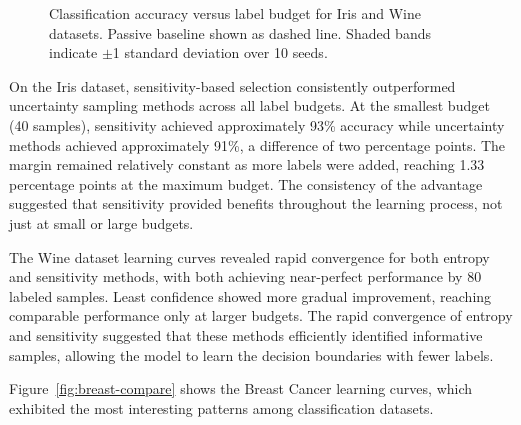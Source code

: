 \documentclass[conference]{IEEEtran}
\begin{document}
\begin{figure}[t]
\centering
{}
\hfill
{}
\caption{Classification accuracy versus label budget for Iris and Wine datasets. Passive baseline shown as dashed line. Shaded bands indicate $\pm$1 standard deviation over 10 seeds.}
\label{fig:iris-compare}
\end{figure}

On the Iris dataset, sensitivity-based selection consistently outperformed uncertainty sampling methods across all label budgets. At the smallest budget (40 samples), sensitivity achieved approximately 93\% accuracy while uncertainty methods achieved approximately 91\%, a difference of two percentage points. The margin remained relatively constant as more labels were added, reaching 1.33 percentage points at the maximum budget. The consistency of the advantage suggested that sensitivity provided benefits throughout the learning process, not just at small or large budgets.

The Wine dataset learning curves revealed rapid convergence for both entropy and sensitivity methods, with both achieving near-perfect performance by 80 labeled samples. Least confidence showed more gradual improvement, reaching comparable performance only at larger budgets. The rapid convergence of entropy and sensitivity suggested that these methods efficiently identified informative samples, allowing the model to learn the decision boundaries with fewer labels.

Figure~\ref{fig:breast-compare} shows the Breast Cancer learning curves, which exhibited the most interesting patterns among classification datasets.
\end{document}
